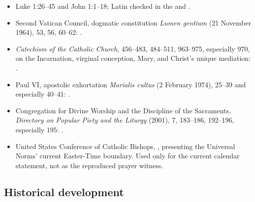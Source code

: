 \begin{itemize}
  \item Luke 1:26--45 and John 1:1--18; Latin checked in the  and .
  \item Second Vatican Council, dogmatic constitution \textit{Lumen gentium} (21 November 1964), 53, 56, 60--62: .
  \item \textit{Catechism of the Catholic Church}, 456--483, 484--511, 963--975, especially 970, on the Incarnation, virginal conception, Mary, and Christ's unique mediation: .
  \item Paul VI, apostolic exhortation \textit{Marialis cultus} (2 February 1974), 25--39 and especially 40--41: .
  \item Congregation for Divine Worship and the Discipline of the Sacraments, \textit{Directory on Popular Piety and the Liturgy} (2001), 7, 183--186, 192--196, especially 195: .
  \item United States Conference of Catholic Bishops, , presenting the Universal Norms' current Easter-Time boundary. Used only for the current calendar statement, not as the reproduced prayer witness.
\end{itemize}

\subsection{Historical development}

